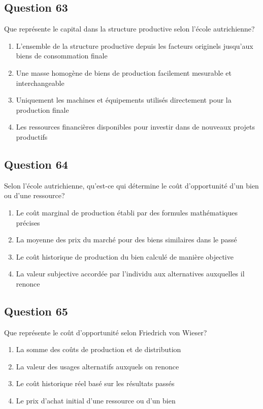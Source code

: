 \documentclass[12pt,a4paper]{article}
\begin{document}
\bigskip


\subsection*{Question 63}
Que représente le capital dans la structure productive selon l'école autrichienne?

\begin{enumerate}[label=\Alph*., leftmargin=*]
\item L'ensemble de la structure productive depuis les facteurs originels jusqu'aux biens de consommation finale
\item Une masse homogène de biens de production facilement mesurable et interchangeable
\item Uniquement les machines et équipements utilisés directement pour la production finale
\item Les ressources financières disponibles pour investir dans de nouveaux projets productifs
\end{enumerate}

\bigskip


\subsection*{Question 64}
Selon l'école autrichienne, qu'est-ce qui détermine le coût d'opportunité d'un bien ou d'une ressource?

\begin{enumerate}[label=\Alph*., leftmargin=*]
\item Le coût marginal de production établi par des formules mathématiques précises
\item La moyenne des prix du marché pour des biens similaires dans le passé
\item Le coût historique de production du bien calculé de manière objective
\item La valeur subjective accordée par l'individu aux alternatives auxquelles il renonce
\end{enumerate}

\bigskip


\subsection*{Question 65}
Que représente le coût d'opportunité selon Friedrich von Wieser?

\begin{enumerate}[label=\Alph*., leftmargin=*]
\item La somme des coûts de production et de distribution
\item La valeur des usages alternatifs auxquels on renonce
\item Le coût historique réel basé sur les résultats passés
\item Le prix d'achat initial d'une ressource ou d'un bien
\end{enumerate}
\end{document}
